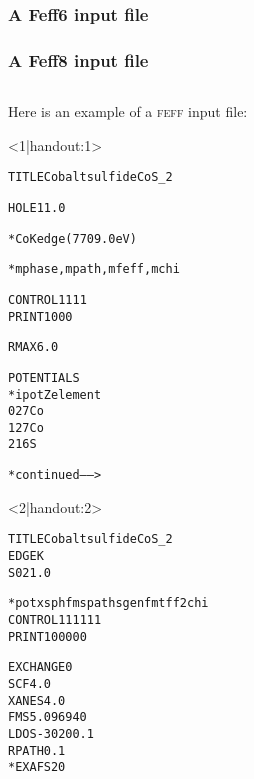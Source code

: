 \documentclass[10pt, xcolor=x11names, compress]{beamer}
\begin{document}
\begin{frame}[fragile]
  \frametitle<1|handout:1>{A Feff6 input file}
  \frametitle<2|handout:2>{A Feff8 input file}
  \begin{columns}[T]
    \begin{column}{0.44\linewidth}
      Here is an example of a \textsc{feff} input file:


      \begin{onlyenv}<1|handout:1>
        \begin{block}{}
          \begin{alltt}
            \tiny
 {\color{Green4}TITLE Cobalt sulfide  CoS\_2}

 {\color{Purple2}HOLE} 1 1.0 {\color{Blue4}*  Co K edge (7709.0 eV)

 *         mphase,mpath,mfeff,mchi}
 {\color{SteelBlue2}CONTROL}   1      1     1     1
 {\color{SteelBlue2}PRINT}     1      0     0     0

 {\color{Purple2}RMAX}        6.0


 {\color{Brown4}POTENTIALS}
 {\color{Blue4}*    ipot   Z  element}
        0   27   Co
        1   27   Co
        2   16   S

                  {\color{Blue4}* continued ------>}
          \end{alltt}
        \end{block}
      \end{onlyenv}
      \begin{onlyenv}<2|handout:2>
        \begin{block}{}
          \begin{alltt}
            \tiny
 {\color{Green4}TITLE Cobalt sulfide  CoS\_2}
 {\color{Purple2}EDGE} K
 {\color{Purple2}S02}  1.0

 {\color{Blue4} *    pot    xsph  fms   paths genfmt ff2chi}
 {\color{SteelBlue2}CONTROL}   1      1     1     1     1     1
 {\color{SteelBlue2}PRINT}     1      0     0     0     0     0

 {\color{Purple2}EXCHANGE}   0
 {\color{Purple2}SCF}        4.0
 {\color{Purple2}XANES}      4.0
 {\color{Purple2}FMS}        5.09694  0
 {\color{Purple2}LDOS}      -30   20     0.1
 {\color{Purple2}RPATH}      0.1
 {\color{Blue4}*EXAFS     20}


\end{alltt}
\end{block}
\end{onlyenv}
\end{column}
\end{columns}
\end{frame}
\end{document}
